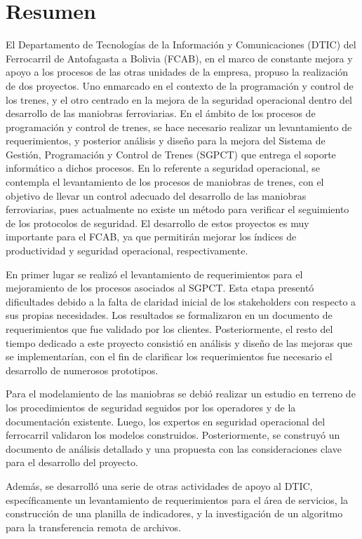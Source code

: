 \documentclass[oneside,12pt, letterpaper, titlepage]{book}
\begin{document}
\newpage
\chapter{Resumen}
El Departamento de Tecnologías de la Información y Comunicaciones (DTIC) del Ferrocarril de Antofagasta a Bolivia (FCAB), en el marco de constante mejora y apoyo a los procesos de las otras unidades de la empresa, propuso la realización de dos proyectos. Uno enmarcado en el contexto de la programación y control de los trenes, y el otro centrado en la mejora de la seguridad operacional dentro del desarrollo de las maniobras ferroviarias.
En el ámbito de los procesos de programación y control de trenes, se hace necesario realizar un levantamiento de requerimientos, y posterior análisis y diseño para la mejora del Sistema de Gestión, Programación y Control de Trenes (SGPCT) que entrega el soporte informático a dichos procesos. En lo referente a seguridad operacional, se contempla el levantamiento de los procesos de maniobras de trenes, con el objetivo de llevar un control adecuado del desarrollo de las maniobras ferroviarias, pues actualmente no existe un método para verificar el seguimiento de los protocolos de seguridad. El desarrollo de estos proyectos es muy importante para el FCAB, ya que permitirán mejorar los índices de productividad y seguridad operacional, respectivamente.


En primer lugar se realizó el levantamiento de requerimientos para el mejoramiento de los procesos asociados al SGPCT. Esta etapa presentó dificultades debido a la falta de claridad inicial de los stakeholders con respecto a sus propias necesidades. Los resultados se formalizaron en un documento de requerimientos que fue validado por los clientes. Posteriormente, el resto del tiempo dedicado a este proyecto consistió en análisis y diseño de las mejoras que se implementarían, con el fin de clarificar los requerimientos fue necesario el desarrollo de numerosos prototipos.

Para el modelamiento de las maniobras se debió realizar un estudio en terreno de los procedimientos de seguridad seguidos por los operadores y de la documentación existente. Luego, los expertos en seguridad operacional del ferrocarril validaron los modelos construidos. Posteriormente, se construyó un documento de análisis detallado y una propuesta con las consideraciones clave para el desarrollo del proyecto.

Además, se desarrolló una serie de otras actividades de apoyo al DTIC, específicamente un levantamiento de requerimientos para el área de servicios, la construcción de una planilla de indicadores, y la investigación de un algoritmo para la transferencia remota de archivos.
\end{document}
